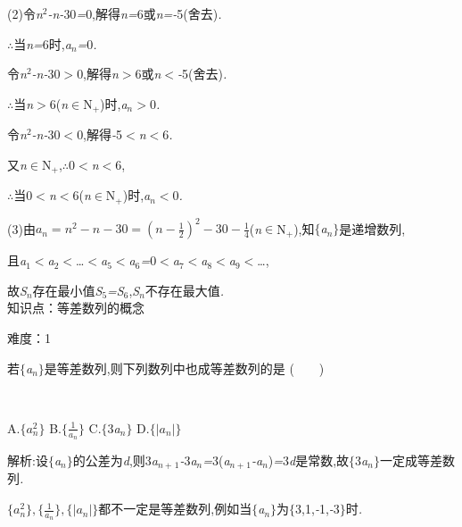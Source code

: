 \documentclass{article} %
\begin{document}
(2)令\textit{n}${}^{2}$\textit{-n-}30\textit{=}0,解得\textit{n=}6或\textit{n=-}5(舍去)\textit{.}

\textit{$\therefore$}当\textit{n=}6时,\textit{a${}_{n}$=}0\textit{.}

令\textit{n}${}^{2}$\textit{-n-}30\textit{$>$}0,解得\textit{n$>$}6或\textit{n$<$-}5(舍去)\textit{.}

\textit{$\therefore$}当\textit{n$>$}6(\textit{n}$\mathrm{\in}$N\textit{${}_{+}$})时,\textit{a${}_{n}$$>$}0\textit{.}

令\textit{n}${}^{2}$\textit{-n-}30\textit{$<$}0,解得\textit{-}5\textit{$<$n$<$}6\textit{.}

又\textit{n}$\mathrm{\in}$N\textit{${}_{+}$},\textit{$\therefore$}0\textit{$<$n$<$}6,

\textit{$\therefore$}当0\textit{$<$n$<$}6(\textit{n}$\mathrm{\in}$N\textit{${}_{+}$})时,\textit{a${}_{n}$$<$}0\textit{.}

(3)由$a_n = n^2-n-30=(n-\frac{1}{2})^2-30-\frac{1}{4}$(\textit{n}$\mathrm{\in}$N\textit{${}_{+}$}),知$\mathrm{\{}$\textit{a${}_{n}$}$\mathrm{\}}$是递增数列,

且\textit{a}${}_{1}$\textit{$<$a}${}_{2}$\textit{$<$}{\dots}\textit{$<$a}${}_{5}$\textit{$<$a}${}_{6}$\textit{=}0\textit{$<$a}${}_{7}$\textit{$<$a}${}_{8}$\textit{$<$a}${}_{9}$\textit{$<$}{\dots},

故\textit{S${}_{n}$}存在最小值\textit{S}${}_{5}$\textit{=S}${}_{6}$,\textit{S${}_{n}$}不存在最大值\textit{.} \\

知识点：等差数列的概念

难度：1

 若$\mathrm{\{}$\textit{a${}_{n}$}$\mathrm{\}}$是等差数列,则下列数列中也成等差数列的是 (\textit{　　})

 \textit{　　　　　　　　　　　　　　　　}

 A.$\{a_n^2\}$ B.$\{\frac{1}{a_n}\}$ C.$\mathrm{\{}$3\textit{a${}_{n}$}$\mathrm{\}}$ D.$\{|a_n|\}$

 解析:设$\mathrm{\{}$\textit{a${}_{n}$}$\mathrm{\}}$的公差为\textit{d},则3\textit{a${}_{n+}$}${}_{1}$\textit{-}3\textit{a${}_{n}$=}3(\textit{a${}_{n+}$}${}_{1}$\textit{-a${}_{n}$})\textit{=}3\textit{d}是常数,故$\mathrm{\{}$3\textit{a${}_{n}$}$\mathrm{\}}$一定成等差数列\textit{.}

$\{a_n^2\},\{\frac{1}{a_n}\},\{|a_n|\}$都不一定是等差数列,例如当$\mathrm{\{}$\textit{a${}_{n}$}$\mathrm{\}}$为$\mathrm{\{}$3,1,\textit{-}1,\textit{-}3$\mathrm{\}}$时\textit{.}
\end{document}
